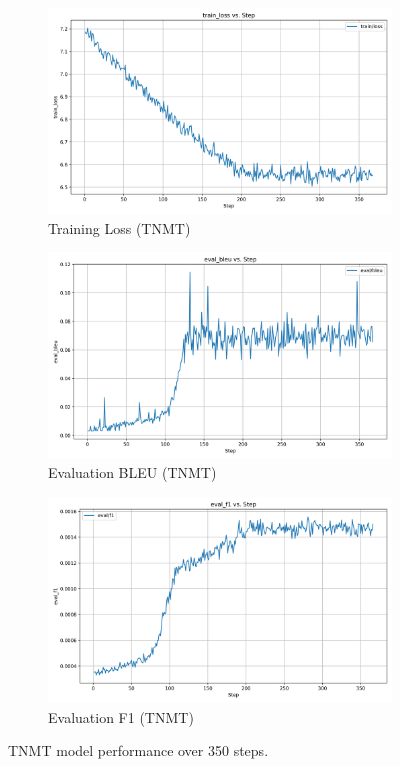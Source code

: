 \documentclass[12pt]{article}
\begin{document}
\begin{figure}[ht]
\centering
\begin{subfigure}[b]{0.32\textwidth}
    \includegraphics[width=\linewidth]{Transformer_train_loss.png}
    \caption{Training Loss (TNMT)}
    \label{fig:tnmt_train_loss}
\end{subfigure}
\hfill
\begin{subfigure}[b]{0.32\textwidth}
    \includegraphics[width=\linewidth]{Transformer_eval_bleu.png}
    \caption{Evaluation BLEU (TNMT)}
    \label{fig:tnmt_eval_bleu}
\end{subfigure}
\hfill
\begin{subfigure}[b]{0.32\textwidth}
    \includegraphics[width=\linewidth]{Transformer_eval_f1.png}
    \caption{Evaluation F1 (TNMT)}
    \label{fig:tnmt_eval_f1}
\end{subfigure}
\caption{TNMT model performance over 350 steps.}
\label{fig:tnmt}
\end{figure}
\end{document}
